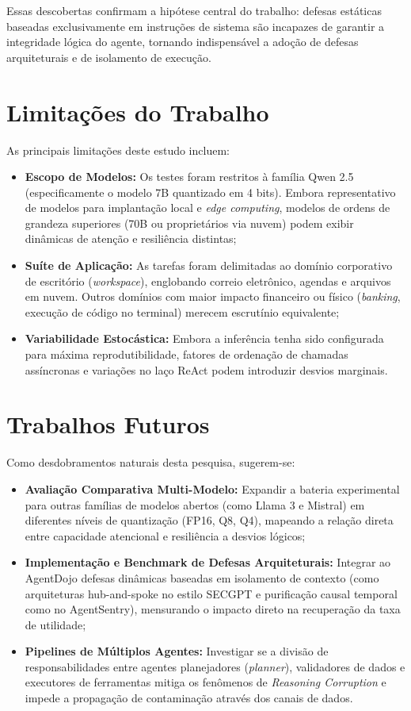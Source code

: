 Essas descobertas confirmam a hipótese central do trabalho: defesas estáticas baseadas exclusivamente em instruções de sistema são incapazes de garantir a integridade lógica do agente, tornando indispensável a adoção de defesas arquiteturais e de isolamento de execução.

\section{Limitações do Trabalho}

As principais limitações deste estudo incluem:
\begin{itemize}
    \item \textbf{Escopo de Modelos:} Os testes foram restritos à família Qwen 2.5 (especificamente o modelo 7B quantizado em 4 bits). Embora representativo de modelos para implantação local e \textit{edge computing}, modelos de ordens de grandeza superiores (70B ou proprietários via nuvem) podem exibir dinâmicas de atenção e resiliência distintas;
    \item \textbf{Suíte de Aplicação:} As tarefas foram delimitadas ao domínio corporativo de escritório (\textit{workspace}), englobando correio eletrônico, agendas e arquivos em nuvem. Outros domínios com maior impacto financeiro ou físico (\textit{banking}, execução de código no terminal) merecem escrutínio equivalente;
    \item \textbf{Variabilidade Estocástica:} Embora a inferência tenha sido configurada para máxima reprodutibilidade, fatores de ordenação de chamadas assíncronas e variações no laço ReAct podem introduzir desvios marginais.
\end{itemize}

\section{Trabalhos Futuros}

Como desdobramentos naturais desta pesquisa, sugerem-se:
\begin{itemize}
    \item \textbf{Avaliação Comparativa Multi-Modelo:} Expandir a bateria experimental para outras famílias de modelos abertos (como Llama 3 e Mistral) em diferentes níveis de quantização (FP16, Q8, Q4), mapeando a relação direta entre capacidade atencional e resiliência a desvios lógicos;
    \item \textbf{Implementação e Benchmark de Defesas Arquiteturais:} Integrar ao AgentDojo defesas dinâmicas baseadas em isolamento de contexto (como arquiteturas hub-and-spoke no estilo SECGPT e purificação causal temporal como no AgentSentry), mensurando o impacto direto na recuperação da taxa de utilidade;
    \item \textbf{Pipelines de Múltiplos Agentes:} Investigar se a divisão de responsabilidades entre agentes planejadores (\textit{planner}), validadores de dados e executores de ferramentas mitiga os fenômenos de \textit{Reasoning Corruption} e impede a propagação de contaminação através dos canais de dados.
\end{itemize}
